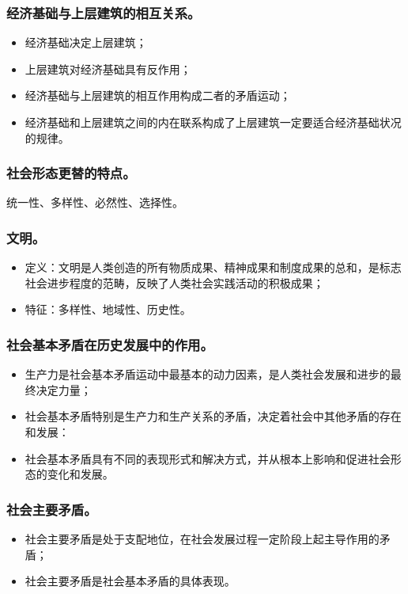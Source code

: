 \documentclass{article}
\begin{document}
\subsubsection{经济基础与上层建筑的相互关系。}
\begin{itemize}
    \item 经济基础决定上层建筑；
    \item 上层建筑对经济基础具有反作用；
    \item 经济基础与上层建筑的相互作用构成二者的矛盾运动；
    \item 经济基础和上层建筑之间的内在联系构成了上层建筑一定要适合经济基础状况的规律。
\end{itemize}

\subsubsection{社会形态更替的特点。}
统一性、多样性、必然性、选择性。

\subsubsection{文明。}
\begin{itemize}
    \item 定义：文明是人类创造的所有物质成果、精神成果和制度成果的总和，是标志社会进步程度的范畴，反映了人类社会实践活动的积极成果；
    \item 特征：多样性、地域性、历史性。
\end{itemize}

\subsubsection{社会基本矛盾在历史发展中的作用。}
\begin{itemize}
    \item 生产力是社会基本矛盾运动中最基本的动力因素，是人类社会发展和进步的最终决定力量；
    \item 社会基本矛盾特别是生产力和生产关系的矛盾，决定着社会中其他矛盾的存在和发展：
    \item 社会基本矛盾具有不同的表现形式和解决方式，并从根本上影响和促进社会形态的变化和发展。
\end{itemize}

\subsubsection{社会主要矛盾。}
\begin{itemize}
    \item 社会主要矛盾是处于支配地位，在社会发展过程一定阶段上起主导作用的矛盾；
    \item 社会主要矛盾是社会基本矛盾的具体表现。
\end{itemize}
\end{document}
